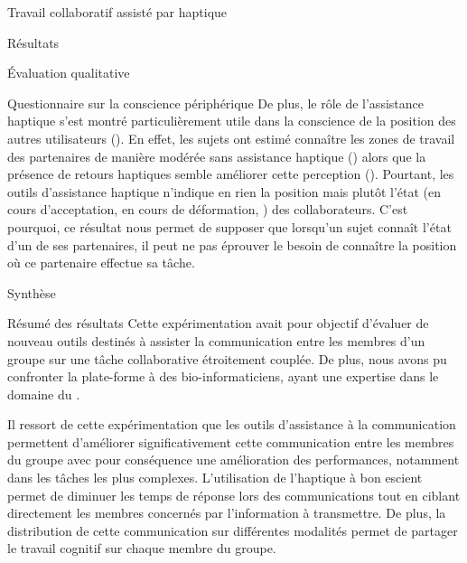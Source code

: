 \documentclass[myfrancais,ngerman,english,frenchb]{mythesis}
\begin{document}
\begin{mychapter}{Travail collaboratif assisté par haptique}
\begin{mysection}{Résultats}
\begin{mysubsection}{Évaluation qualitative}
\begin{mysubsubsection}{Questionnaire sur la conscience périphérique}
					De plus, le rôle de l'assistance haptique s'est montré particulièrement utile dans la conscience de la position des autres utilisateurs ().
					En effet, les sujets ont estimé connaître les zones de travail des partenaires de manière modérée sans assistance haptique () alors que la présence de retours haptiques semble améliorer cette perception ().
					Pourtant, les outils d'assistance haptique n'indique en rien la position mais plutôt l'état (en cours d'acceptation, en cours de déformation, \myetc) des collaborateurs.
					C'est pourquoi, ce résultat nous permet de supposer que lorsqu'un sujet connaît l'état d'un de ses partenaires, il peut ne pas éprouver le besoin de connaître la position où ce partenaire effectue sa tâche.
				\end{mysubsubsection}
			\end{mysubsection}
		\end{mysection}
		\begin{mysection}{Synthèse}
			\begin{mysubsection}{Résumé des résultats}
				Cette expérimentation avait pour objectif d'évaluer de nouveau outils destinés à assister la communication entre les membres d'un groupe sur une tâche collaborative étroitement couplée.
				De plus, nous avons pu confronter la plate-forme \myShaddock à des bio-informaticiens, ayant une expertise dans le domaine du .

				Il ressort de cette expérimentation que les outils d'assistance à la communication permettent d'améliorer significativement cette communication entre les membres du groupe avec pour conséquence une amélioration des performances, notamment dans les tâches les plus complexes.
				L'utilisation de l'haptique à bon escient permet de diminuer les temps de réponse lors des communications tout en ciblant directement les membres concernés par l'information à transmettre.
				De plus, la distribution de cette communication sur différentes modalités permet de partager le travail cognitif sur chaque membre du groupe.


\end{mysubsection}
\end{mysection}
\end{mychapter}
\end{document}
